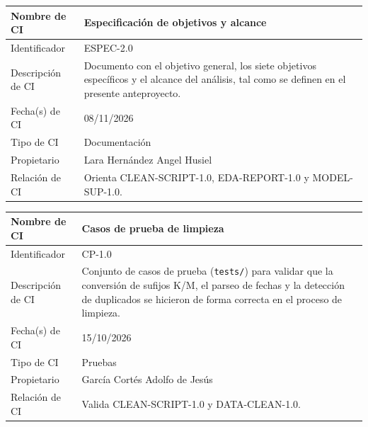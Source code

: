 \documentclass[letterpaper,11pt]{article}
\begin{document}
\noindent\begin{minipage}{\textwidth}
\small\renewcommand{\arraystretch}{1.9}
\begin{tabularx}{\textwidth}{|p{3.3cm}|Y|}
\hline
Nombre de CI & Especificación de objetivos y alcance \\ \hline
Identificador & ESPEC-2.0 \\ \hline
Descripción de CI & Documento con el objetivo general, los siete objetivos específicos y el alcance del análisis, tal como se definen en el presente anteproyecto. \\ \hline
Fecha(s) de CI & 08/11/2026 \\ \hline
Tipo de CI & Documentación \\ \hline
Propietario & Lara Hernández Angel Husiel \\ \hline
Relación de CI & Orienta CLEAN-SCRIPT-1.0, EDA-REPORT-1.0 y MODEL-SUP-1.0. \\ \hline
\end{tabularx}
\end{minipage}\par\bigskip
\noindent\begin{minipage}{\textwidth}
\small\renewcommand{\arraystretch}{1.9}
\begin{tabularx}{\textwidth}{|p{3.3cm}|Y|}
\hline
Nombre de CI & Casos de prueba de limpieza \\ \hline
Identificador & CP-1.0 \\ \hline
Descripción de CI & Conjunto de casos de prueba (\texttt{tests/}) para validar que la conversión de sufijos K/M, el parseo de fechas y la detección de duplicados se hicieron de forma correcta en el proceso de limpieza. \\ \hline
Fecha(s) de CI & 15/10/2026 \\ \hline
Tipo de CI & Pruebas \\ \hline
Propietario & García Cortés Adolfo de Jesús \\ \hline
Relación de CI & Valida CLEAN-SCRIPT-1.0 y DATA-CLEAN-1.0. \\ \hline
\end{tabularx}
\end{minipage}\par\bigskip
\end{document}

